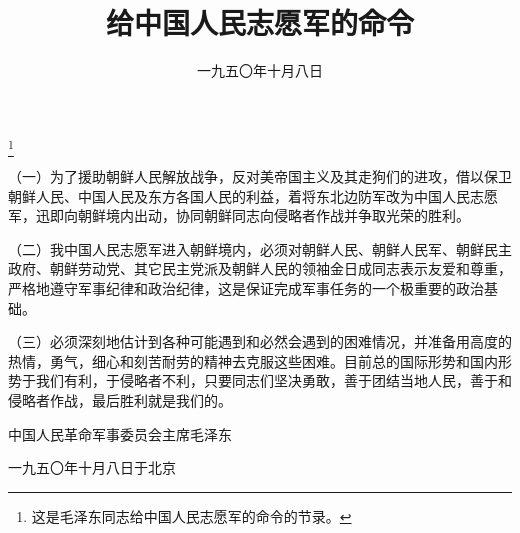 
\title{给中国人民志愿军的命令}
\date{一九五〇年十月八日}
\thanks{这是毛泽东同志给中国人民志愿军的命令的节录。}
\maketitle



（一）为了援助朝鲜人民解放战争，反对美帝国主义及其走狗们的进攻，借以保卫朝鲜人民、中国人民及东方各国人民的利益，着将东北边防军改为中国人民志愿军，迅即向朝鲜境内出动，协同朝鲜同志向侵略者作战并争取光荣的胜利。

（二）我中国人民志愿军进入朝鲜境内，必须对朝鲜人民、朝鲜人民军、朝鲜民主政府、朝鲜劳动党、其它民主党派及朝鲜人民的领袖金日成同志表示友爱和尊重，严格地遵守军事纪律和政治纪律，这是保证完成军事任务的一个极重要的政治基础。

（三）必须深刻地估计到各种可能遇到和必然会遇到的困难情况，并准备用高度的热情，勇气，细心和刻苦耐劳的精神去克服这些困难。目前总的国际形势和国内形势于我们有利，于侵略者不利，只要同志们坚决勇敢，善于团结当地人民，善于和侵略者作战，最后胜利就是我们的。

中国人民革命军事委员会主席毛泽东

一九五〇年十月八日于北京
